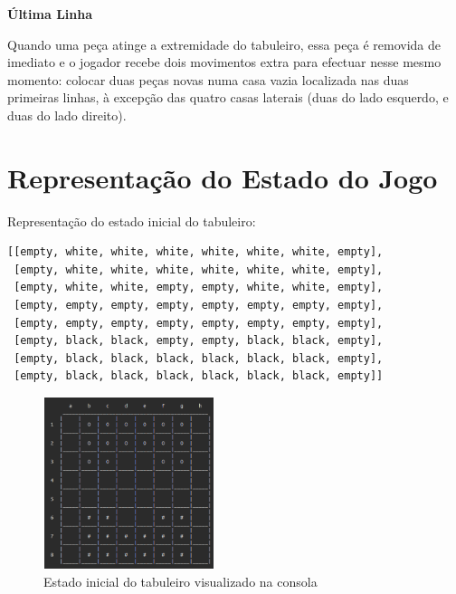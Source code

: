 \documentclass[a4paper]{article}
\begin{document}
\large{\textbf{Última Linha}}
\begin{small}

Quando uma peça atinge a extremidade do tabuleiro, essa peça é removida de imediato e o jogador recebe dois movimentos extra para efectuar nesse mesmo momento: colocar duas peças novas numa casa vazia localizada nas duas primeiras linhas, à excepção das quatro casas laterais (duas do lado esquerdo, e duas do lado direito).
\end{small}\newline

\section{Representação do Estado do Jogo}


Representação do estado inicial do tabuleiro:
\begin{small}
\begin{lstlisting}
[[empty, white, white, white, white, white, white, empty],
 [empty, white, white, white, white, white, white, empty],
 [empty, white, white, empty, empty, white, white, empty],
 [empty, empty, empty, empty, empty, empty, empty, empty],
 [empty, empty, empty, empty, empty, empty, empty, empty],
 [empty, black, black, empty, empty, black, black, empty],
 [empty, black, black, black, black, black, black, empty],
 [empty, black, black, black, black, black, black, empty]]
\end{lstlisting}
\end{small}
\begin{figure}[h!]
	\centering
    \includegraphics[height=5cm,width=5cm]{res/initialBoard.png}
    \caption{Estado inicial do tabuleiro visualizado na consola}
    \label{fig:9}
\end{figure}
\end{document}
